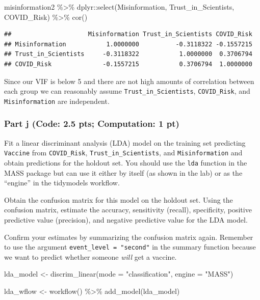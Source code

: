 \documentclass[
]{article}
\newenvironment{Shaded}{\begin{snugshade}}{\end{snugshade}}
\newcommand{\AttributeTok}[1]{\textcolor[rgb]{0.77,0.63,0.00}{#1}}
\newcommand{\FunctionTok}[1]{\textcolor[rgb]{0.00,0.00,0.00}{#1}}
\newcommand{\NormalTok}[1]{#1}
\newcommand{\OtherTok}[1]{\textcolor[rgb]{0.56,0.35,0.01}{#1}}
\newcommand{\SpecialCharTok}[1]{\textcolor[rgb]{0.00,0.00,0.00}{#1}}
\newcommand{\StringTok}[1]{\textcolor[rgb]{0.31,0.60,0.02}{#1}}
\begin{document}
\begin{Shaded}
\begin{Highlighting}[]
\NormalTok{misinformation2 }\SpecialCharTok{\%\textgreater{}\%} 
\NormalTok{  dplyr}\SpecialCharTok{::}\FunctionTok{select}\NormalTok{(Misinformation, Trust\_in\_Scientists, COVID\_Risk) }\SpecialCharTok{\%\textgreater{}\%} 
  \FunctionTok{cor}\NormalTok{()}
\end{Highlighting}
\end{Shaded}

\begin{verbatim}
##                     Misinformation Trust_in_Scientists COVID_Risk
## Misinformation           1.0000000          -0.3118322 -0.1557215
## Trust_in_Scientists     -0.3118322           1.0000000  0.3706794
## COVID_Risk              -0.1557215           0.3706794  1.0000000
\end{verbatim}

Since our VIF is below 5 and there are not high amounts of correlation
between each group we can reasonably assume
\texttt{Trust\_in\_Scientists}, \texttt{COVID\_Risk}, and
\texttt{Misinformation} are independent.

\hypertarget{part-j-code-2.5-pts-computation-1-pt}{%
\subsubsection{Part j (Code: 2.5 pts; Computation: 1
pt)}\label{part-j-code-2.5-pts-computation-1-pt}}

Fit a linear discriminant analysis (LDA) model on the training set
predicting \texttt{Vaccine} from \texttt{COVID\_Risk},
\texttt{Trust\_in\_Scientists}, and \texttt{Misinformation} and obtain
predictions for the holdout set. You should use the \texttt{lda}
function in the MASS package but can use it either by itself (as shown
in the lab) or as the ``engine'' in the tidymodels workflow.

Obtain the confusion matrix for this model on the holdout set. Using the
confusion matrix, estimate the accuracy, sensitivity (recall),
specificity, positive predictive value (precision), and negative
predictive value for the LDA model.

Confirm your estimates by summarizing the confusion matrix again.
Remember to use the argument \texttt{event\_level\ =\ "second"} in the
summary function because we want to predict whether someone \emph{will}
get a vaccine.

\begin{Shaded}
\begin{Highlighting}[]
\NormalTok{lda\_model }\OtherTok{\textless{}{-}} \FunctionTok{discrim\_linear}\NormalTok{(}\AttributeTok{mode =} \StringTok{"classification"}\NormalTok{, }\AttributeTok{engine =} \StringTok{"MASS"}\NormalTok{)}

\NormalTok{lda\_wflow }\OtherTok{\textless{}{-}} \FunctionTok{workflow}\NormalTok{() }\SpecialCharTok{\%\textgreater{}\%}
  \FunctionTok{add\_model}\NormalTok{(lda\_model)}
\end{Highlighting}
\end{Shaded}
\end{document}
